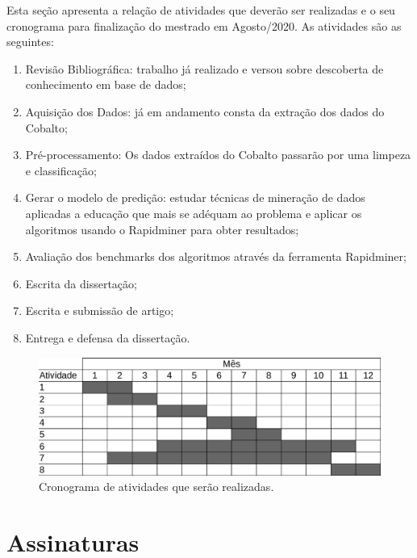 \documentclass[diss-proposta,nocipinfo]{texufpel}
\begin{document}
Esta seção apresenta a relação de atividades que deverão ser realizadas e o seu  cronograma para finalização do mestrado em Agosto/2020. As atividades são as seguintes:
\begin{enumerate}
    \item Revisão Bibliográfica: trabalho já realizado e versou sobre descoberta de conhecimento em base de dados;
    \item Aquisição dos Dados: já em andamento consta da extração dos dados do Cobalto;
    \item Pré-processamento: Os dados extraídos do Cobalto passarão por uma limpeza e classificação;
    \item Gerar o modelo de predição: estudar técnicas de mineração de dados aplicadas a educação que mais se adéquam ao problema e aplicar os algoritmos usando o Rapidminer para obter resultados;
    \item Avaliação dos benchmarks dos algoritmos através da ferramenta Rapidminer;
    \item Escrita da  dissertação;
    \item Escrita e submissão de artigo;
    \item Entrega e defensa da dissertação.
\end{enumerate}

\begin{figure}[htbp]
  \centering \includegraphics[scale=.4]{imagens/cronograma.png}
  \caption{Cronograma de atividades que serão realizadas.}
  \label{fig:cronograma}
\end{figure}





\chapter{Assinaturas}
\vspace{2cm}
\end{document}

